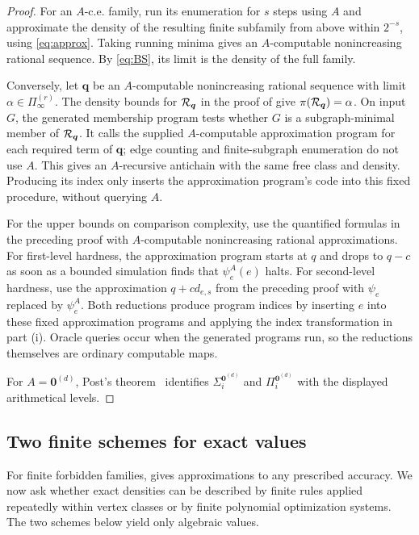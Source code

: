 \documentclass[10pt]{article}
\numberwithin{equation}{section}
\theoremstyle{definition}
\newcommand{\zero}{\mathbf 0}\newcommand{\one}{\mathbf 1}
\begin{document}
\begin{proof}
For an $A$-c.e. family, run its enumeration for $s$ steps using $A$ and approximate the density of the resulting finite subfamily from above within $2^{-s}$, using \eqref{eq:approx}. Taking running minima gives an $A$-computable nonincreasing rational sequence. By \eqref{eq:BS}, its limit is the density of the full family.

Conversely, let $\boldsymbol q$ be an $A$-computable nonincreasing rational sequence with limit $\alpha\in\Pi_\infty^{(r)}$. The density bounds for $\mathcal R_{\boldsymbol q}$ in the proof of  give $\pi(\mathcal R_{\boldsymbol q})=\alpha$. On input $G$, the generated membership program tests whether $G$ is a subgraph-minimal member of $\mathcal R_{\boldsymbol q}$. It calls the supplied $A$-computable approximation program for each required term of $\boldsymbol q$; edge counting and finite-subgraph enumeration do not use $A$. This gives an $A$-recursive antichain with the same free class and density. Producing its index only inserts the approximation program's code into this fixed procedure, without querying $A$.

For the upper bounds on comparison complexity, use the quantified formulas in the preceding proof with $A$-computable nonincreasing rational approximations. For first-level hardness, the approximation program starts at $q$ and drops to $q-c$ as soon as a bounded simulation finds that $\psi_e^A(e)$ halts. For second-level hardness, use the approximation $q+cd_{e,s}$ from the preceding proof with $\psi_e$ replaced by $\psi_e^A$. Both reductions produce program indices by inserting $e$ into these fixed approximation programs and applying the index transformation in part (i). Oracle queries occur when the generated programs run, so the reductions themselves are ordinary computable maps.

For $A=\zero^{(d)}$, Post's theorem~\cite{Post1944,Soare1987} identifies $\Sigma_i^{\zero^{(d)}}$ and $\Pi_i^{\zero^{(d)}}$ with the displayed arithmetical levels.
\end{proof}
\subsection{Two finite schemes for exact values}\label{sec:semialgebraic}
For finite forbidden families,  gives approximations to any prescribed accuracy. We now ask whether exact densities can be described by finite rules applied repeatedly within vertex classes or by finite polynomial optimization systems. The two schemes below yield only algebraic values.
\end{document}
